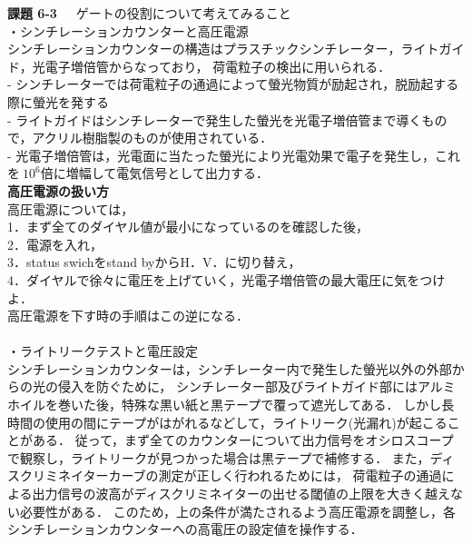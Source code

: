\documentclass[a4j,10pt,oneside,openany]{jsbook}
\begin{document}
{{\bf 課題 6-3}~~~ゲートの役割について考えてみること\\


・シンチレーションカウンターと高圧電源\\
シンチレーションカウンターの構造はプラスチックシンチレーター，ライトガイド，光電子増倍管からなっており，
荷電粒子の検出に用いられる．\\
- シンチレーターでは荷電粒子の通過によって螢光物質が励起され，脱励起する際に螢光を発する\\
- ライトガイドはシンチレーターで発生した螢光を光電子増倍管まで導くもので，アクリル樹脂製のものが使用されている．\\
- 光電子増倍管は，光電面に当たった螢光により光電効果で電子を発生し，これを$~10^6$倍に増幅して電気信号として出力する．\\

{\bf 高圧電源の扱い方}\\
高圧電源については，\\
1．まず全てのダイヤル値が最小になっているのを確認した後，\\
2．電源を入れ，\\
3．status swichをstand byからH．V．に切り替え，\\
4．ダイヤルで徐々に電圧を上げていく，光電子増倍管の最大電圧に気をつけよ．\\
高圧電源を下す時の手順はこの逆になる．\\
\\
・ライトリークテストと電圧設定\\
シンチレーションカウンターは，シンチレーター内で発生した螢光以外の外部からの光の侵入を防ぐために，
シンチレーター部及びライトガイド部にはアルミホイルを巻いた後，特殊な黒い紙と黒テープで覆って遮光してある．
しかし長時間の使用の間にテープがはがれるなどして，ライトリーク(光漏れ)が起こることがある．
従って，まず全てのカウンターについて出力信号をオシロスコープで観察し，ライトリークが見つかった場合は黒テープで補修する．
また，ディスクリミネイターカーブの測定が正しく行われるためには，
荷電粒子の通過による出力信号の波高がディスクリミネイターの出せる閾値の上限を大きく越えない必要性がある．
このため，上の条件が満たされるよう高圧電源を調整し，各シンチレーションカウンターへの高電圧の設定値を操作する．\\

}
\end{document}
